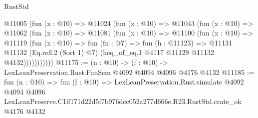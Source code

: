 \begin{lexlean}{RustStd}
\begin{coremodule}
        @11005
          (fun (x : @10) =>
          @11024
            (fun (x : @10) =>
            @11043
              (fun (x : @10) =>
              @11062
                (fun (x : @10) =>
                @11081
                  (fun (x : @10) =>
                  @11100
                    (fun (x : @10) =>
                    @11119
                      (fun (x : @10) =>
                      fun (fn : @7) =>
                      fun (h : @11123) =>
                      @11131
                        @11132
                        (Eq.refl.{2} (Sort 1) @7)
                        (heq_of_eq.{1} @4117 @11129 @11132 @4132)))))))))))
@11175 := (n : @10) -> (f : @10) -> LexLeanPreservation.Rust.FunSem @4092 @4094 @4096 @4176 @4132
@11185 := fun (n : @10) =>
  fun (f : @10) =>
  LexLeanPreservation.Rust.simulate
    @4092
    @4094
    @4096
    LexLeanPreserve.C1ff171d22d5f7b976dcc052a277d666e.R23.RustStd.crate_ok
    @4176
    @4132
\end{coremodule}
\end{lexlean}

